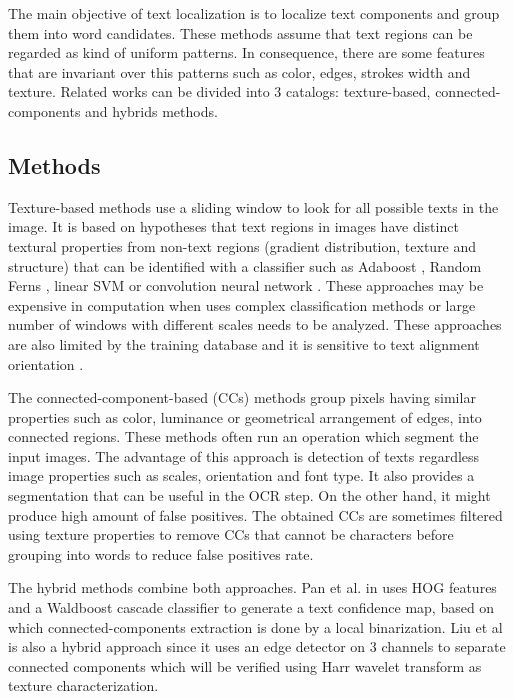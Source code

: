 The main objective of text localization is to localize text components and group them into word candidates. These methods assume that text regions can be regarded as kind of uniform patterns. In consequence, there are some features that are invariant over this patterns such as color, edges, strokes width and texture. Related works can be divided into 3 catalogs: texture-based, connected-components and hybrids methods. 

\subsection{Methods}


Texture-based methods \cite{Chen.2004.CVPR} \cite{Lee.2011.ICDAR} \cite{wang.2011.iccv} \cite{Coates.2011.ICDAR} \cite{Wang.2012.ICPR} use a sliding window to look for all possible texts in the image. It is based on hypotheses that text regions in images have distinct textural properties from non-text regions (gradient distribution, texture and structure) that can be identified with a classifier such as Adaboost \cite{Lee.2011.ICDAR}, Random Ferns \cite{wang.2011.iccv}, linear SVM \cite{Coates.2011.ICDAR} or convolution neural network \cite{Wang.2012.ICPR}. These approaches may be expensive in computation when uses complex classification methods or large number of windows with different scales needs to be analyzed. These approaches are also limited by the training database and it is sensitive to text alignment orientation \cite{Pan.2011.TIP}. 


The connected-component-based (CCs) methods \cite{Epshtein.2010.CVPR} \cite{xucheng.2013.pami} \cite{Neumann.2011.ICDAR} \cite{Lee.2010.ICPR} group pixels having similar properties such as color, luminance or geometrical arrangement of edges, into connected regions. These methods often run an operation which segment the input images. The advantage of this approach is detection of texts regardless image properties such as scales, orientation and font type. It also provides a segmentation that can be useful in the OCR step. On the other hand, it might produce high amount of false positives. The obtained CCs are sometimes filtered using texture properties to remove CCs that cannot be characters before grouping into words to reduce false positives rate.


The hybrid methods combine both approaches. Pan et al. in \cite{Pan2009} uses HOG features and a Waldboost cascade classifier to generate a text confidence map, based on which connected-components extraction is done by a local binarization. Liu et al \cite{Liu.2006.CRA} is also a hybrid approach since it uses an edge detector on 3 channels to separate connected components which will be verified using Harr wavelet transform as texture characterization.

